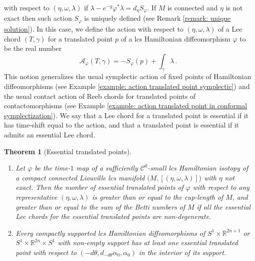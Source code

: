 \documentclass{amsart}
\newtheorem{thm}{Theorem}[section]
\theoremstyle{remark}
\begin{document}
with respect to $(\eta, \omega, \lambda)$
if $\lambda - e^{-g} \varphi^{\ast}\lambda = d_{\eta}S_{\varphi}$.
If $M$ is connected and $\eta$ is not exact
then such action $S_{\varphi}$ is uniquely defined
(see Remark \ref{remark: unique solution}).
In this case,
we define the action with respect to $(\eta, \omega, \lambda)$
of a Lee chord $(T, \gamma)$
for a translated point $p$
of a lcs Hamiltonian diffeomorphism $\varphi$
to be the real number
\[
\mathcal{A}_{\varphi}(T, \gamma)
= - S_{\varphi}(p) + \int_{\gamma} \lambda \,.
\]
This notion generalizes the usual symplectic action of fixed points
of Hamiltonian diffeomorphisms
(see Example \ref{example: action translated point symplectic})
and the usual contact action of Reeb chords for translated points
of contactomorphisms
(see Example \ref{example: action translated point in conformal symplectization}).
We say that a Lee chord for a translated point is essential
if it has time-shift equal to the action,
and that a translated point is essential
if it admits an essential Lee chord.

\begin{thm}[Essential translated points]\label{theorem: translated points - intro}
\renewcommand{\theenumi}{\roman{enumi}} \
\begin{enumerate}
\item Let $\varphi$ be the time-$1$ map
of a sufficiently $\mathcal{C}^0$-small
lcs Hamiltonian isotopy
of a compact connected Liouville lcs manifold
$\big( M , [(\eta, \omega, \lambda)]\big)$
with $\eta$ not exact.
Then the number of essential translated points of $\varphi$
with respect to any representative $(\eta, \omega, \lambda)$
is greater than or equal to the cup-length of $M$,
and greater than or equal to the sum of the Betti numbers of $M$
if all the essential Lee chords for the essential translated points
are non-degenerate.
\item Every compactly supported lcs Hamiltonian diffeomorphisms
of $S^1 \times \mathbb{R}^{2n+1}$ or $S^1 \times \mathbb{R}^{2n} \times S^1$
with non-empty support
has at least one essential translated point
with respect to $(-d\theta, d_{-d\theta}\alpha_0, \alpha_0)$
in the interior of its support.
\end{enumerate}
\end{thm}
\end{document}
